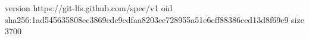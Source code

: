 version https://git-lfs.github.com/spec/v1
oid sha256:1ad545635808ec3869cdc9cdfaa8203ee728955a51e6eff88386ced13d8f69e9
size 3700
